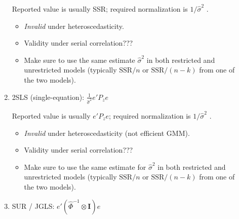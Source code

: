 \documentclass[8pt,letterpaper, landscape]{extarticle} %
\newcommand{\mI}{\ensuremath{\mathbf{I}}}
\begin{document}
\begin{multicols}{3}
\begin{description}
\begin{enumerate}
Reported value is usually SSR; required normalization is $ 1/ \hat{\sigma}^2 $ .
\begin{itemize}
\item \textit{Invalid} under heteroscedasticity.
\item Validity under serial correlation???
\item Make sure to use the same estimate $ \hat{\sigma}^2 $ in both restricted and unrestricted models (typically $ \text{SSR} / n $ or $ \text{SSR} / (n-k) $ from one of the two models).
\end{itemize}
\item 2SLS (single-equation): $ \frac{1}{\hat{\sigma}^2} e' P_z e  $

Reported value is usually $ e' P_z e $; required normalization is $ 1/ \hat{\sigma}^2 $ .
\begin{itemize}
\item \textit{Invalid} under heteroscedasticity (not efficient GMM).
\item Validity under serial correlation???
\item Make sure to use the same estimate for $ \hat{\sigma}^2 $ in both restricted and unrestricted models (typically $ \text{SSR} / n $ or $ \text{SSR} / (n-k) $ from one of the two models).
\end{itemize}
\item SUR / JGLS: $ e' (\widehat{\Phi}^{-1} \otimes \mI) e  $


\end{enumerate}
\end{description}
\end{multicols}
\end{document}
